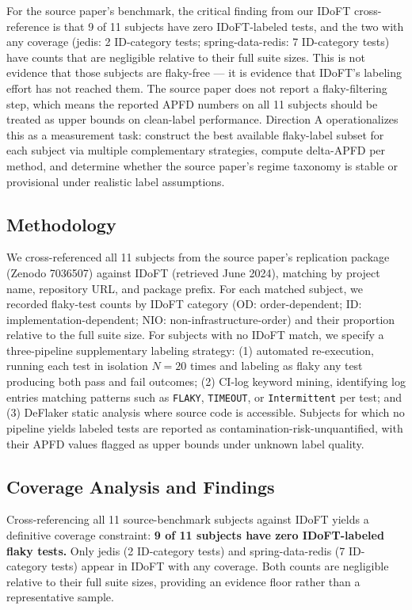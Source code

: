 \documentclass[conference]{IEEEtran}
\begin{document}
For the source paper's benchmark, the critical finding from our IDoFT cross-reference is that 9 of 11 subjects have zero IDoFT-labeled tests, and the two with any coverage (jedis: 2 ID-category tests; spring-data-redis: 7 ID-category tests) have counts that are negligible relative to their full suite sizes. This is not evidence that those subjects are flaky-free — it is evidence that IDoFT's labeling effort has not reached them. The source paper does not report a flaky-filtering step, which means the reported APFD numbers on all 11 subjects should be treated as upper bounds on clean-label performance. Direction A operationalizes this as a measurement task: construct the best available flaky-label subset for each subject via multiple complementary strategies, compute delta-APFD per method, and determine whether the source paper's regime taxonomy is stable or provisional under realistic label assumptions.


\subsection{Methodology}

We cross-referenced all 11 subjects from the source paper's replication package (Zenodo 7036507) against IDoFT (retrieved June 2024), matching by project name, repository URL, and package prefix. For each matched subject, we recorded flaky-test counts by IDoFT category (OD: order-dependent; ID: implementation-dependent; NIO: non-infrastructure-order) and their proportion relative to the full suite size. For subjects with no IDoFT match, we specify a three-pipeline supplementary labeling strategy: (1) automated re-execution, running each test in isolation $N=20$ times and labeling as flaky any test producing both pass and fail outcomes; (2) CI-log keyword mining, identifying log entries matching patterns such as \texttt{FLAKY}, \texttt{TIMEOUT}, or \texttt{Intermittent} per test; and (3) DeFlaker static analysis where source code is accessible. Subjects for which no pipeline yields labeled tests are reported as contamination-risk-unquantified, with their APFD values flagged as upper bounds under unknown label quality.

\subsection{Coverage Analysis and Findings}

Cross-referencing all 11 source-benchmark subjects against IDoFT yields a definitive coverage constraint: \textbf{9 of 11 subjects have zero IDoFT-labeled flaky tests.} Only jedis (2 ID-category tests) and spring-data-redis (7 ID-category tests) appear in IDoFT with any coverage. Both counts are negligible relative to their full suite sizes, providing an evidence floor rather than a representative sample.
\end{document}
